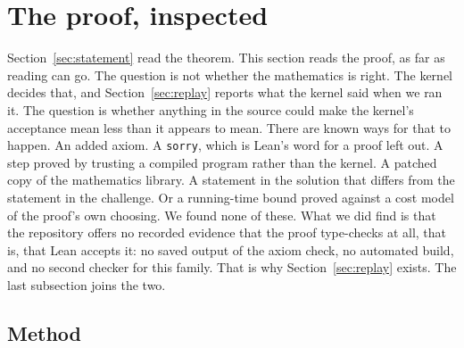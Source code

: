 \section{The proof, inspected}
\label{sec:proof}
\begingroup\sloppy

Section~\ref{sec:statement} read the theorem. This section reads the
proof, as far as reading can go. The question is not whether the
mathematics is right. The kernel decides that, and
Section~\ref{sec:replay} reports what the kernel said when we ran it.
The question is whether anything in the source could make the kernel's
acceptance mean less than it appears to mean. There are known ways for
that to happen. An added axiom. A \texttt{sorry}, which is Lean's word
for a proof left out. A step proved by trusting a compiled program
rather than the kernel. A patched copy of the mathematics library. A
statement in the solution that differs from the statement in the
challenge. Or a running-time bound proved against a cost model of the
proof's own choosing. We found none of these. What we did find is that
the repository offers no recorded evidence that the proof type-checks at all, that is, that Lean accepts it: no saved output of the axiom check, no automated build, and no
second checker for this family. That is why Section~\ref{sec:replay}
exists. The last subsection joins the two.

\subsection{Method}
\label{sec:proof-method}


